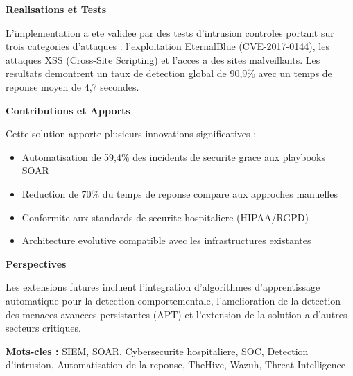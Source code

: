 \vspace{0.5cm}

\textbf{Realisations et Tests}

L'implementation a ete validee par des tests d'intrusion controles portant sur trois categories d'attaques : l'exploitation EternalBlue (CVE-2017-0144), les attaques XSS (Cross-Site Scripting) et l'acces a des sites malveillants. Les resultats demontrent un taux de detection global de 90,9\% avec un temps de reponse moyen de 4,7 secondes.

\vspace{0.5cm}

\textbf{Contributions et Apports}

Cette solution apporte plusieurs innovations significatives :
\begin{itemize}
    \item Automatisation de 59,4\% des incidents de securite grace aux playbooks SOAR
    \item Reduction de 70\% du temps de reponse compare aux approches manuelles
    \item Conformite aux standards de securite hospitaliere (HIPAA/RGPD)
    \item Architecture evolutive compatible avec les infrastructures existantes
\end{itemize}

\vspace{0.5cm}

\textbf{Perspectives}

Les extensions futures incluent l'integration d'algorithmes d'apprentissage automatique pour la detection comportementale, l'amelioration de la detection des menaces avancees persistantes (APT) et l'extension de la solution a d'autres secteurs critiques.

\vspace{1cm}

\textbf{Mots-cles :} SIEM, SOAR, Cybersecurite hospitaliere, SOC, Detection d'intrusion, Automatisation de la reponse, TheHive, Wazuh, Threat Intelligence

\newpage
